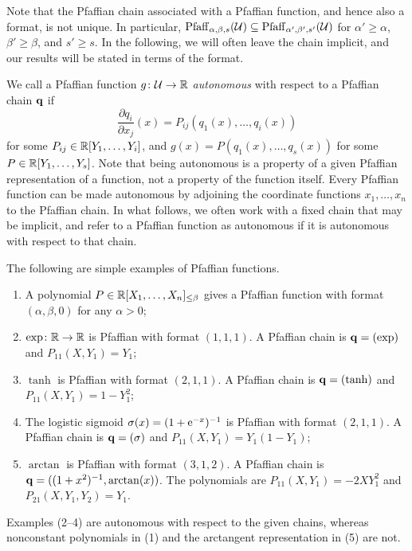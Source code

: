 \begin{remark}
 Note that the Pfaffian chain associated with a Pfaffian function, and hence also a format, is not unique. In particular, $\mathrm{Pfaff}_{\alpha,\beta,s}(\mathcal{U})\subseteq \mathrm{Pfaff}_{\alpha',\beta',s'}(\mathcal{U})$ for $\alpha'\geq \alpha$, $\beta'\geq \beta$, and $s'\geq s$. In the following, we will often leave the chain implicit, and our results will be stated in terms of the format.
\end{remark}

We call a Pfaffian function $g\colon \mathcal{U}\to \mathbb{R}$ \emph{autonomous} with respect to a Pfaffian chain $\mathbf{q}$ if 
\begin{equation}\label{eq:simplepfaff}
  \frac{\partial q_i}{\partial x_j}(x) = P_{ij}(q_1(x),\dots,q_i(x))
\end{equation}
for some $P_{ij}\in \mathbb{R}[Y_1,\dots,Y_i]$, and $g(x)=P(q_1(x), \dots, q_s(x))$ for some $P\in \mathbb{R}[Y_1,\dots,Y_s]$. 
Note that being autonomous is a property of a given Pfaffian representation of a function, not a property of the function itself. Every Pfaffian function can be made autonomous by adjoining the coordinate functions $x_1,\dots,x_n$ to the Pfaffian chain. In what follows, we often work with a fixed chain that may be implicit, and refer to a Pfaffian function as autonomous if it is autonomous with respect to that chain.

\begin{example}\label{ex:1} The following are simple examples of Pfaffian functions.
        \begin{enumerate}
            \item A polynomial $P\in\mathbb{R}[X_1,\dots,X_n]_{\le\beta}$ gives a Pfaffian function with format $(\alpha,\beta,0)$ for any $\alpha>0$;
            \item $\exp\colon \mathbb{R}\to \mathbb{R}$ is Pfaffian with format $(1,1,1)$. A Pfaffian chain is $\mathbf{q}=(\exp)$ and $P_{11}(X,Y_1)=Y_1$;
            \item $\tanh$ is Pfaffian with format $(2,1,1)$. A Pfaffian chain is $\mathbf{q}=(\tanh)$ and $P_{11}(X,Y_1)=1-Y_1^2$;
            \item The logistic sigmoid $\sigma(x) = (1 + \mathrm{e}^{-x})^{-1}$ is Pfaffian with format $(2, 1, 1)$. A Pfaffian chain is $\mathbf{q}=(\sigma)$ and $P_{11}(X,Y_1)=Y_1(1-Y_1)$;
            \item $\arctan$ is Pfaffian with format $(3, 1, 2)$. A Pfaffian chain is $\mathbf{q}=((1+x^2)^{-1},\arctan(x))$. The polynomials are $P_{11}(X,Y_1) = -2XY_1^2$ and $P_{21}(X,Y_1,Y_2)=Y_1$. 
        \end{enumerate}
Examples (2--4) are autonomous with respect to the given chains, whereas nonconstant polynomials in (1) and the arctangent representation in (5) are not.
\end{example}


